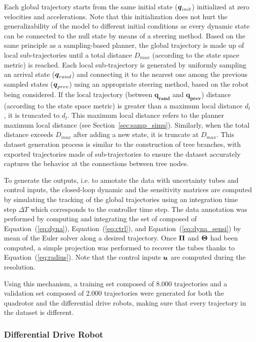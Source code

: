 Each global trajectory starts from the same initial state ($\boldsymbol{q}_{init}$) initialized at zero velocities and accelerations.
Note that this initialization does not hurt the generalizability of the model to different initial conditions as every dynamic state can be connected to the null state by means of a steering method.
Based on the same principle as a sampling-based planner, the global trajectory is made up of local sub-trajectories until a total distance $D_{max}$ (according to the state space metric) is reached.
Each local sub-trajectory is generated by uniformly sampling an arrival state ($\boldsymbol{q}_{rand}$) and connecting it to the nearest one among the previous sampled states ($\boldsymbol{q}_{prev}$) using an appropriate steering method, based on the robot being considered.
If the local trajectory (between $\boldsymbol{q_{rand}}$ and $\boldsymbol{q_{prev}}$) distance (according to the state space metric) is greater than a maximum local distance $d_l$, it is truncated to $d_l$. 
This maximum local distance refers to the planner maximum local distance (see Section~\ref{sec:samp_simu}).
Similarly, when the total distance exceeds $D_{max}$ after adding a new state, it is truncate at $D_{max}$.
This dataset generation process is similar to the construction of tree branches, with exported trajectories made of sub-trajectories to ensure the dataset accurately captures the behavior at the connections between tree nodes.

To generate the outputs, i.e. to annotate the data with uncertainty tubes and control inputs, the closed-loop dynamic and the sensitivity matrices are computed by simulating the tracking of the global trajectories using an integration time step $\Delta T$ which corresponds to the controller time step.
The data annotation was performed by computing and integrating the set of  composed of Equation~(\ref{eq:dyna}), Equation~(\ref{eq:ctrl}), and Equation~(\ref{eq:dyna_sensi}) by mean of the Euler  solver along a desired trajectory. 
Once $\boldsymbol{\Pi}$ and $\boldsymbol{\Theta}$ had been computed, a simple projection was performed to recover the tubes thanks to Equation~(\ref{eq:radius}).
Note that the control inputs $\boldsymbol{u}$ are computed during the  resolution.

Using this mechanism, a training set composed of 8.000 trajectories and a validation set composed of 2.000 trajectories were generated for both the quadrotor and the differential drive robots, making sure that every trajectory in the dataset is different.

\subsubsection{Differential Drive Robot}\label{sec:dataset_unic}

